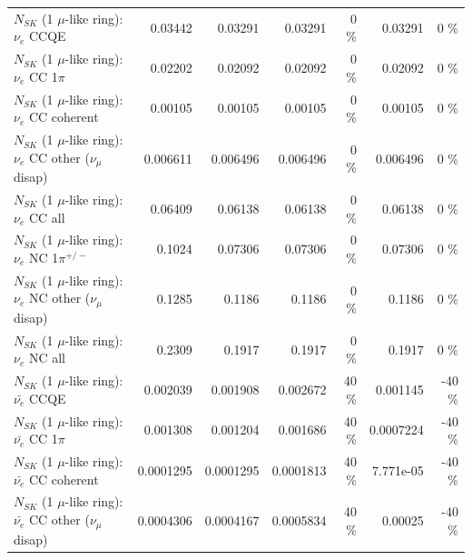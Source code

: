 \begin{table}
\begin{tabular}{| l | r | r | r  r | r  r |}
\hline
\hline
\hline
                                      $N_{SK}$ (1 $\mu$-like ring): $\nu_e$ CCQE &         0.03442 &         0.03291 &         0.03291 &        0 \%  &         0.03291 &        0 \%  \\ 
                                 $N_{SK}$ (1 $\mu$-like ring): $\nu_e$ CC 1$\pi$ &         0.02202 &         0.02092 &         0.02092 &        0 \%  &         0.02092 &        0 \%  \\ 
                               $N_{SK}$ (1 $\mu$-like ring): $\nu_e$ CC coherent &         0.00105 &         0.00105 &         0.00105 &        0 \%  &         0.00105 &        0 \%  \\ 
                $N_{SK}$ (1 $\mu$-like ring): $\nu_e$ CC other ($\nu_\mu$ disap) &        0.006611 &        0.006496 &        0.006496 &        0 \%  &        0.006496 &        0 \%  \\ 
                                  $N_{SK}$ (1 $\mu$-like ring): $\nu_{e}$ CC all &         0.06409 &         0.06138 &         0.06138 &        0 \%  &         0.06138 &        0 \%  \\ 
\hline
                           $N_{SK}$ (1 $\mu$-like ring): $\nu_e$ NC 1$\pi^{+/-}$ &          0.1024 &         0.07306 &         0.07306 &        0 \%  &         0.07306 &        0 \%  \\ 
                $N_{SK}$ (1 $\mu$-like ring): $\nu_e$ NC other ($\nu_\mu$ disap) &          0.1285 &          0.1186 &          0.1186 &        0 \%  &          0.1186 &        0 \%  \\ 
                                  $N_{SK}$ (1 $\mu$-like ring): $\nu_{e}$ NC all &          0.2309 &          0.1917 &          0.1917 &        0 \%  &          0.1917 &        0 \%  \\ 
\hline
\hline
\hline
                                $N_{SK}$ (1 $\mu$-like ring): $\bar{\nu_e}$ CCQE &        0.002039 &        0.001908 &        0.002672 &       40 \%  &        0.001145 &      -40 \%  \\ 
                           $N_{SK}$ (1 $\mu$-like ring): $\bar{\nu_e}$ CC 1$\pi$ &        0.001308 &        0.001204 &        0.001686 &       40 \%  &       0.0007224 &      -40 \%  \\ 
                         $N_{SK}$ (1 $\mu$-like ring): $\bar{\nu_e}$ CC coherent &       0.0001295 &       0.0001295 &       0.0001813 &       40 \%  &       7.771e-05 &      -40 \%  \\ 
          $N_{SK}$ (1 $\mu$-like ring): $\bar{\nu_e}$ CC other ($\nu_\mu$ disap) &       0.0004306 &       0.0004167 &       0.0005834 &       40 \%  &         0.00025 &      -40 \%  \\ 

\end{tabular}
\end{table}
